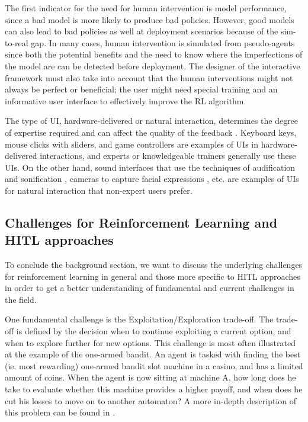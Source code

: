 \documentclass[twoside,11pt]{article}
\begin{document}
\begin{enumerate}
The first indicator for the need for human intervention is model performance, since a bad model is more likely to produce bad policies. However, good models can also lead to bad policies as well at deployment scenarios because of the sim-to-real gap. In many cases, human intervention is simulated from pseudo-agents since both the potential benefits and the need to know where the imperfections of the model are can be detected before deployment. The designer of the interactive framework must also take into account that the human interventions might not always be perfect or beneficial; the user might need special training and an informative user interface to effectively improve the RL algorithm. 

The type of UI, hardware-delivered or natural interaction,  determines the degree of expertise required and can affect the quality of the feedback \citep{lin:20}. Keyboard keys, mouse clicks with sliders, and game controllers are examples of UIs in hardware-delivered interactions, and experts or knowledgeable trainers generally use these UIs. On the other hand, sound interfaces that use the techniques of audification and sonification \citep{Hermann:2011:Sonification,kartoun:10, Saranti:2009,Scurto:2021:DesigningDeepRLHumanParameterExploration}, cameras to capture facial expressions \citep{arakawa:18}, etc. are examples of UIs for natural interaction that non-expert users prefer. 

\subsection{Challenges for Reinforcement Learning and HITL approaches} 
\label{sec:ChallengesRL}

To conclude the background section, we want to discuss the underlying challenges for reinforcement learning in general and those more specific to HITL approaches in order to get a better understanding of fundamental and current challenges in the field.

One fundamental challenge is the Exploitation/Exploration trade-off. The trade-off is defined by the decision when to continue exploiting a current option, and when to explore further for new options. This challenge is most often illustrated at the example of the one-armed bandit. An agent is tasked with finding the best (ie. most rewarding) one-armed bandit slot machine in a casino, and has a limited amount of coins. When the agent is now sitting at machine A, how long does he take to evaluate whether this machine provides a higher payoff, and when does he cut his losses to move on to another automaton? A more in-depth description of this problem can be found in \citet{AudibertMunosSzepesv:2009:ExplorationExploitation}.


\end{enumerate}
\end{document}
